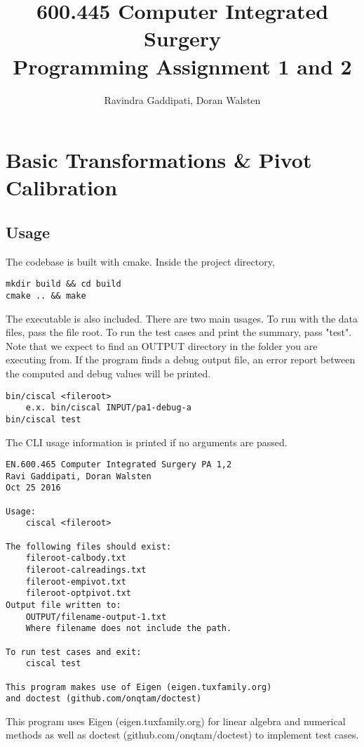 \documentclass[letterpaper, 11pt]{report}
\begin{document}
\title{600.445 Computer Integrated Surgery \\ Programming Assignment 1 and 2}
\author{Ravindra Gaddipati, Doran Walsten}
\maketitle

\pagebreak

\chapter*{Basic Transformations \& Pivot Calibration}
\setcounter{chapter}{1}

\section{Usage}
The codebase is built with cmake. Inside the project directory,
\begin{verbatim}
mkdir build && cd build
cmake .. && make
\end{verbatim}
The executable is also included.
There are two main usages. To run with the data files, pass the file root. To run the test cases and print the summary, pass "test". Note that we expect to find an OUTPUT directory in the folder you are executing from. If the program finds a debug output file, an error report between the computed and debug values will be printed.
\begin{verbatim}
bin/ciscal <fileroot>
    e.x. bin/ciscal INPUT/pa1-debug-a
bin/ciscal test
\end{verbatim}
The CLI usage information is printed if no arguments are passed.
\begin{verbatim}
EN.600.465 Computer Integrated Surgery PA 1,2
Ravi Gaddipati, Doran Walsten
Oct 25 2016

Usage:
    ciscal <fileroot>

The following files should exist:
    fileroot-calbody.txt
    fileroot-calreadings.txt
    fileroot-empivot.txt
    fileroot-optpivot.txt
Output file written to:
    OUTPUT/filename-output-1.txt
    Where filename does not include the path.

To run test cases and exit:
    ciscal test

This program makes use of Eigen (eigen.tuxfamily.org)
and doctest (github.com/onqtam/doctest)
\end{verbatim}
This program uses Eigen (eigen.tuxfamily.org) for linear algebra and numerical methods as well as doctest (github.com/onqtam/doctest) to implement test cases.
\end{document}
